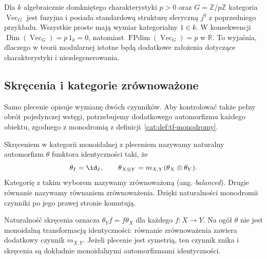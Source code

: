 \begin{przyklad}\label{cat:ex:tf-positive-char-dimension}
Dla $k$ algebraicznie domkniętego charakterystyki $p>0$ oraz $G=\mathbb Z/p\mathbb Z$ kategoria $\operatorname{Vec}_G$ jest fuzyjna i posiada standardową strukturę sferyczną $j^0$ z poprzedniego przykładu. Wszystkie proste mają wymiar kategorialny $1\in k$. W konsekwencji $\operatorname{Dim}(\operatorname{Vec}_G)=p\,1_k=0$, natomiast $\operatorname{FPdim}(\operatorname{Vec}_G)=p$ w $\mathbb R$. To wyjaśnia, dlaczego w teorii modularnej istotne będą dodatkowe założenia dotyczące charakterystyki i niezdegenerowania.
\end{przyklad}

\subsection{Skręcenia i kategorie zrównoważone}

Samo plecenie opisuje wymianę dwóch czynników. Aby kontrolować także pełny obrót pojedynczej wstęgi, potrzebujemy dodatkowego automorfizmu każdego obiektu, zgodnego z monodromią z definicji~\ref{cat:def:tf-monodromy}.

\begin{definicja}\label{cat:def:tf-twist}
Skręceniem w kategorii monoidalnej z pleceniem nazywamy naturalny automorfizm $\theta$ funktora identyczności taki, że
\[
 \theta_I=\id_I,\qquad
 \theta_{X\otimes Y}
 =m_{X,Y}(\theta_X\otimes\theta_Y).
\]
Kategorię z takim wyborem nazywamy zrównoważoną (ang. \emph{balanced}). Drugie równanie nazywamy równaniem zrównoważenia. Dzięki naturalności monodromii czynniki po jego prawej stronie komutują.
\end{definicja}

Naturalność skręcenia oznacza $\theta_Y f=f\theta_X$ dla każdego $f:X\to Y$. Na ogół $\theta$ nie jest monoidalną transformacją identyczności: równanie zrównoważenia zawiera dodatkowy czynnik $m_{X,Y}$. Jeżeli plecenie jest symetrią, ten czynnik znika i skręcenia są dokładnie monoidalnymi automorfizmami identyczności.

